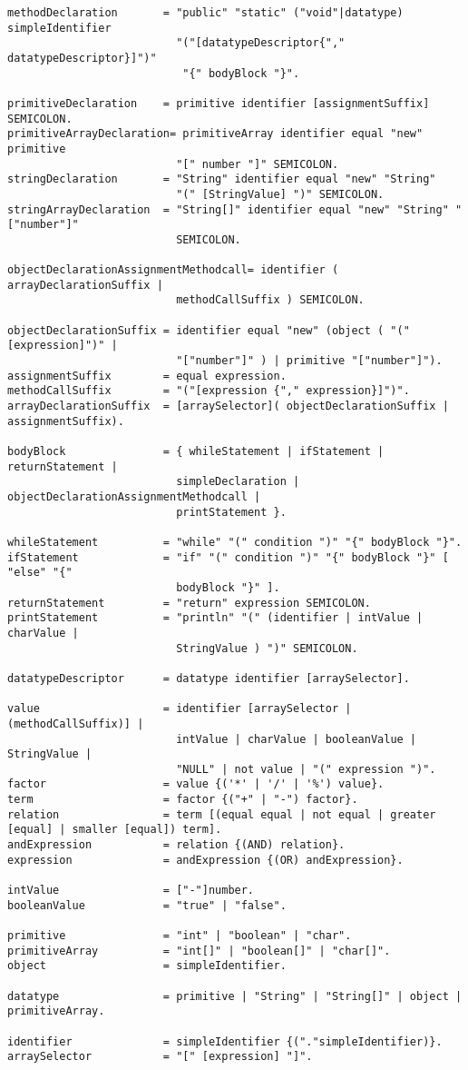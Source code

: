 \begin{verbatim}
methodDeclaration       = "public" "static" ("void"|datatype) simpleIdentifier
                          "("[datatypeDescriptor{"," datatypeDescriptor}]")" 
                           "{" bodyBlock "}".

primitiveDeclaration    = primitive identifier [assignmentSuffix] SEMICOLON.
primitiveArrayDeclaration= primitiveArray identifier equal "new" primitive 
                          "[" number "]" SEMICOLON.
stringDeclaration       = "String" identifier equal "new" "String" 
                          "(" [StringValue] ")" SEMICOLON.
stringArrayDeclaration	= "String[]" identifier equal "new" "String" "["number"]" 
                          SEMICOLON.

objectDeclarationAssignmentMethodcall= identifier ( arrayDeclarationSuffix | 
                          methodCallSuffix ) SEMICOLON.

objectDeclarationSuffix = identifier equal "new" (object ( "("[expression]")" |
                          "["number"]" ) | primitive "["number"]").
assignmentSuffix        = equal expression.
methodCallSuffix        = "("[expression {"," expression}]")".
arrayDeclarationSuffix  = [arraySelector]( objectDeclarationSuffix | assignmentSuffix).
 
bodyBlock               = { whileStatement | ifStatement | returnStatement | 
                          simpleDeclaration | objectDeclarationAssignmentMethodcall | 
                          printStatement }.

whileStatement          = "while" "(" condition ")" "{" bodyBlock "}".
ifStatement             = "if" "(" condition ")" "{" bodyBlock "}" [ "else" "{" 
                          bodyBlock "}" ].
returnStatement         = "return" expression SEMICOLON.
printStatement          = "println" "(" (identifier | intValue | charValue | 
                          StringValue ) ")" SEMICOLON.

datatypeDescriptor      = datatype identifier [arraySelector].

value                   = identifier [arraySelector | (methodCallSuffix)] | 
                          intValue | charValue | booleanValue | StringValue |
                          "NULL" | not value | "(" expression ")".
factor                  = value {('*' | '/' | '%') value}.
term                    = factor {("+" | "-") factor}.
relation                = term [(equal equal | not equal | greater [equal] | smaller [equal]) term].
andExpression           = relation {(AND) relation}.
expression              = andExpression {(OR) andExpression}.

intValue                = ["-"]number.
booleanValue            = "true" | "false".

primitive               = "int" | "boolean" | "char".
primitiveArray          = "int[]" | "boolean[]" | "char[]".
object                  = simpleIdentifier.

datatype                = primitive | "String" | "String[]" | object | primitiveArray.

identifier              = simpleIdentifier {("."simpleIdentifier)}.
arraySelector           = "[" [expression] "]".


\end{verbatim}


